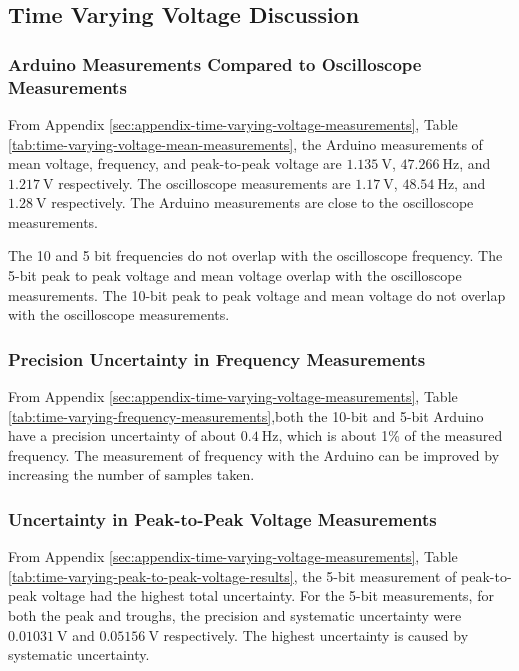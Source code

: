 \subsection{Time Varying Voltage Discussion}
\subsubsection{Arduino Measurements Compared to Oscilloscope Measurements}
\noindent From Appendix \ref{sec:appendix-time-varying-voltage-measurements}, Table \ref{tab:time-varying-voltage-mean-measurements},
the Arduino measurements of mean voltage, frequency, and peak-to-peak voltage are $\qty{1.135}{\volt}$, $\qty{47.266}{\hertz}$, and $\qty{1.217}{\volt}$ respectively.
The oscilloscope measurements are $\qty{1.17}{\volt}$, $\qty{48.54}{\hertz}$, and $\qty{1.28}{\volt}$ respectively. The Arduino measurements are close 
to the oscilloscope measurements. 

The 10 and 5 bit frequencies do not overlap with the oscilloscope frequency. The 5-bit peak to peak voltage and mean voltage overlap with the oscilloscope measurements.
The 10-bit peak to peak voltage and mean voltage do not overlap with the oscilloscope measurements.

\subsubsection{Precision Uncertainty in Frequency Measurements}
\noindent From Appendix \ref{sec:appendix-time-varying-voltage-measurements}, Table \ref{tab:time-varying-frequency-measurements},both the 10-bit 
and 5-bit Arduino have a precision uncertainty of about $\qty{0.4}{\hertz}$, which is about 1\% of the measured frequency. 
The measurement of frequency with the Arduino can be improved by increasing the number of samples taken.

\subsubsection{Uncertainty in Peak-to-Peak Voltage Measurements}
\noindent From Appendix \ref{sec:appendix-time-varying-voltage-measurements}, Table \ref{tab:time-varying-peak-to-peak-voltage-results}, 
the 5-bit measurement of peak-to-peak voltage had the highest total uncertainty. For the 5-bit measurements, for both the peak and troughs, 
the precision and systematic uncertainty were $\qty{0.01031}{\volt}$ and $\qty{0.05156}{\volt}$ respectively. The highest uncertainty is caused by 
systematic uncertainty.


